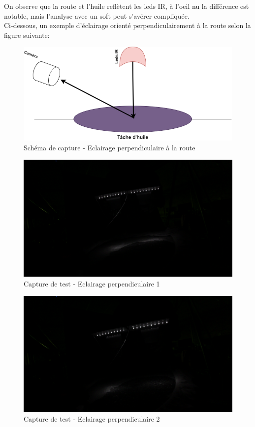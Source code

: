 On observe que la route et l'huile reflètent les leds IR, à l'oeil nu la différence est notable, mais l'analyse avec un soft peut s'avérer compliquée.\\
Ci-dessous, un exemple d'éclairage orienté perpendiculairement à la route selon la figure suivante:
\begin{figure}[H]
    \centering
    \includegraphics[width=13cm]{assets/figures/eclairage_perpendiculaire.png}
    \caption{Schéma de capture - Eclairage perpendiculaire à la route}
\end{figure}

\begin{figure}[H]
    \centering
    \includegraphics[width=13cm]{assets/figures/eclairage_perpendiculaire1.png}
    \caption{Capture de test - Eclairage perpendiculaire 1}
\end{figure}
\begin{figure}[H]
    \centering
    \includegraphics[width=13cm]{assets/figures/eclairage_perpendiculaire2.png}
    \caption{Capture de test - Eclairage perpendiculaire 2}
\end{figure}

